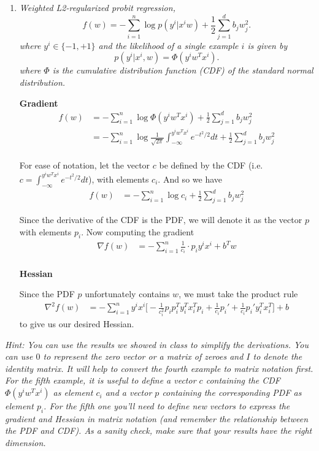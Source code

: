 \begin{enumerate}
	\item \textit{Weighted L2-regularized probit regression,}
	$$f(w) = - \sum_{i=1}^n \log p(y^i | x^i w) + \frac{1}{2}\sum_{j=1}^d b_jw_j^2.$$
	\textit{where $y^i \in \{-1,+1\}$ and the likelihood of a single example $i$ is given by}
	$$p(y^i| x^i, w) = \Phi(y^iw^Tx^i).$$
	\textit{where $\Phi$ is the cumulative distribution function (CDF) of the standard normal distribution.}
	
	\textbf{Gradient}
	\begin{align*}
		f(w) & = - \sum_{i=1}^n \log \Phi(y^iw^Tx^i) + \frac{1}{2}\sum_{j=1}^d b_jw_j^2 \\
		& = - \sum_{i=1}^n \log  \frac{1}{\sqrt{2\pi}} \int_{-\infty}^{y^iw^Tx^i} e^{-t^2/2} dt + \frac{1}{2}\sum_{j=1}^d b_jw_j^2 \\
	\end{align*}
	
	For ease of notation, let the vector $c$ be defined by the CDF (i.e. $c = \int_{-\infty}^{y^iw^Tx^i} e^{-t^2/2} dt$), with elements $c_i$. And so we have
	\begin{align*}
		f(w) & = - \sum_{i=1}^n \log c_i + \frac{1}{2}\sum_{j=1}^d b_jw_j^2
	\end{align*}
	
	Since the derivative of the CDF is the PDF, we will denote it as the vector $p$ with elements $p_i$. Now computing the gradient
	\begin{align*}
		\nabla f(w) & = - \sum_{i=1}^n \frac{1}{c_i} \cdot p_iy^ix^i+ b^Tw \\
	\end{align*}

	\textbf{Hessian}
	
	Since the PDF $p$ unfortunately contains $w$, we must take the product rule 
	\begin{align*}
		\nabla^2 f(w) & = - \sum_{i=1}^n y^ix^i \Big[-\frac{1}{c_i^2} p_ip_i^Ty_i^Tx_i^T p_i + \frac{1}{c_i} p_i' + \frac{1}{c_i}p_i'y_i^Tx_i^T \Big] + b
	\end{align*}
	to give us our desired Hessian.
	
\end{enumerate}


\textit{Hint: You can use the results we showed in class to simplify the derivations. You can use $0$ to represent the zero vector or a matrix of zeroes and $I$ to denote the identity matrix. It will help to convert the fourth example to matrix notation first. For the fifth example, it is useful to define a vector $c$ containing the CDF $\Phi(y^iw^Tx^i)$ as element $c_i$ and a vector $p$ containing the corresponding PDF as element $p_i$. For the fifth one you'll need to define new vectors to express the gradient and Hessian in matrix notation (and remember the relationship between the PDF and CDF). As a sanity check, make sure that your results have the right dimension.}



